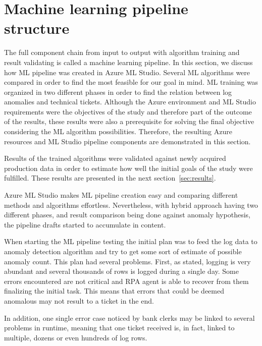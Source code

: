 

\section{Machine learning pipeline structure}\label{sec:ml-pipeline}

The full component chain from input to output
with algorithm training and result validating
is called a machine learning pipeline.
In this section,
we discuss how ML pipeline was created in Azure ML Studio.
Several ML algorithms were compared
in order to find the most feasible for our goal in mind.
ML training was organized in two different phases
in order to find the relation between
log anomalies and technical tickets.
Although the Azure environment and ML Studio requirements
were the objectives of the study and therefore part of the outcome of the results,
these results were also a prerequisite for solving the final objective
considering the ML algorithm possibilities.
Therefore,
the resulting Azure resources and ML Studio pipeline components
are demonstrated in this section.

Results of the trained algorithms
were validated against newly acquired production data
in order to estimate how well the initial goals of the study
were fulfilled.
These results are presented in the next section~\ref{sec:results}.

Azure ML Studio makes ML pipeline creation easy
and comparing different methods and algorithms effortless.
Nevertheless,
with hybrid approach having two different phases,
and result comparison being done against anomaly hypothesis,
the pipeline drafts started to accumulate in content.

When starting the ML pipeline testing
the initial plan was to feed the log data to anomaly detection algorithm
and try to get some sort of estimate of possible anomaly count.
This plan had several problems.
First, as stated, logging is very abundant
and several thousands of rows is logged
during a single day.
Some errors encountered are not critical
and RPA agent is able to recover from them
finalizing the initial task.
This means that errors that could be deemed anomalous
may not result to a ticket in the end.

In addition,
one single error case noticed by bank clerks
may be linked to several problems in runtime,
meaning that one ticket received is,
in fact, linked to multiple, dozens or
even hundreds of log rows.

